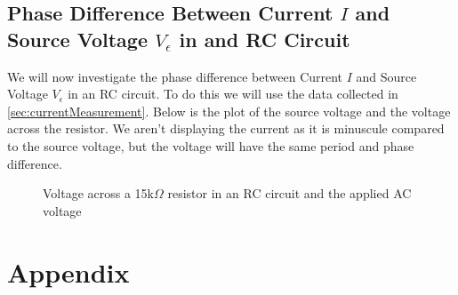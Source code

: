 \documentclass[12pt]{article}
\numberwithin{equation}{section}
\numberwithin{figure}{section}
\begin{document}
    \subsection{Phase Difference Between Current \texorpdfstring{$I$}{I} and Source Voltage \texorpdfstring{$V_\epsilon$}{Ve} in and RC Circuit}\label{sec:current}
    We will now investigate the phase difference between Current $I$ and Source Voltage $V_\epsilon$ in an RC 
    circuit. To do this we will use the data collected in \autoref{sec:currentMeasurement}. Below is the plot 
    of the source voltage and the voltage across the resistor. We aren't displaying the current as it is 
    minuscule compared to the source voltage, but the voltage will have the same period and phase difference.
    \begin{figure}[H]
        \begin{center}
           \caption{Voltage across a 15k$\Omega$ resistor in an RC circuit and the applied AC voltage}
           \label{fig:CurrentPhaseDiff}
        \end{center}
    \end{figure}
    


    \newpage
    \section{Appendix}
    \setcounter{figure}{0} \renewcommand{\thefigure}{A.\arabic{figure}}
    
\end{document}
